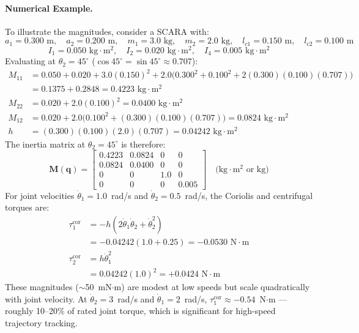 \documentclass{article}
\begin{document}
\paragraph{Numerical Example.}
To illustrate the magnitudes, consider a SCARA with:
\[
a_1 = 0.300\text{ m},\quad a_2 = 0.200\text{ m},\quad
m_1 = 3.0\text{ kg},\quad m_2 = 2.0\text{ kg},\quad
l_{c1} = 0.150\text{ m},\quad l_{c2} = 0.100\text{ m}
\]
\[
I_1 = 0.050\text{ kg}\cdot\text{m}^2,\quad I_2 = 0.020\text{ kg}\cdot\text{m}^2,\quad I_4 = 0.005\text{ kg}\cdot\text{m}^2
\]
Evaluating at $\theta_2 = 45^\circ$ ($\cos 45^\circ = \sin 45^\circ \approx 0.707$):
\begin{align*}
M_{11} &= 0.050 + 0.020 + 3.0(0.150)^2 + 2.0\bigl(0.300^2 + 0.100^2 + 2(0.300)(0.100)(0.707)\bigr) \\
       &= 0.1375 + 0.2848 = 0.4223 \text{ kg}\cdot\text{m}^2 \\[6pt]
M_{22} &= 0.020 + 2.0(0.100)^2 = 0.0400 \text{ kg}\cdot\text{m}^2 \\[6pt]
M_{12} &= 0.020 + 2.0\bigl(0.100^2 + (0.300)(0.100)(0.707)\bigr) = 0.0824 \text{ kg}\cdot\text{m}^2 \\[6pt]
h      &= (0.300)(0.100)(2.0)(0.707) = 0.04242 \text{ kg}\cdot\text{m}^2
\end{align*}
The inertia matrix at $\theta_2 = 45^\circ$ is therefore:
\begin{equation*}
\mathbf{M}(\mathbf{q}) = \begin{bmatrix}
0.4223 & 0.0824 & 0 & 0 \\
0.0824 & 0.0400 & 0 & 0 \\
0      & 0      & 1.0 & 0 \\
0      & 0      & 0 & 0.005
\end{bmatrix} \quad \text{(kg}\cdot\text{m}^2\text{ or kg)}
\end{equation*}
For joint velocities $\dot{\theta}_1 = 1.0$~rad/s and $\dot{\theta}_2 = 0.5$~rad/s, the Coriolis and centrifugal torques are:
\begin{align*}
\tau_1^{\mathrm{cor}} &= -h(2\dot{\theta}_1\dot{\theta}_2 + \dot{\theta}_2^2) \\
                      &= -0.04242(1.0 + 0.25) = -0.0530 \text{ N}\cdot\text{m} \\[4pt]
\tau_2^{\mathrm{cor}} &= h\dot{\theta}_1^2 \\
                      &= 0.04242(1.0)^2 = +0.0424 \text{ N}\cdot\text{m}
\end{align*}
These magnitudes ($\sim$50~mN$\cdot$m) are modest at low speeds but scale quadratically with joint velocity. At $\dot{\theta}_2 = 3$~rad/s and $\dot{\theta}_1 = 2$~rad/s, $\tau_1^{\mathrm{cor}} \approx -0.54$~N$\cdot$m --- roughly 10--20\% of rated joint torque, which is significant for high-speed trajectory tracking.
\end{document}
